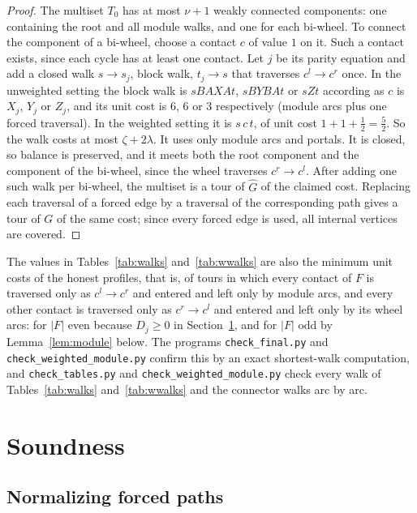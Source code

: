 \documentclass[11pt]{amsart}
\theoremstyle{definition}
\theoremstyle{remark}
\numberwithin{equation}{section}
\newcommand{\Gh}{\widehat{G}}
\begin{document}
\begin{proof}
The multiset $T_0$ has at most $\nu+1$ weakly connected components: one containing the root and all module walks, and one for each bi-wheel. To connect the component of a bi-wheel, choose a contact $c$ of value $1$ on it. Such a contact exists, since each cycle has at least one contact. Let $j$ be its parity equation and add a closed walk $s\to s_j$, block walk, $t_j\to s$ that traverses $c^l\to c^r$ once. In the unweighted setting the block walk is $sBAXAt$, $sBYBAt$ or $sZt$ according as $c$ is $X_j$, $Y_j$ or $Z_j$, and its unit cost is $6$, $6$ or $3$ respectively (module arcs plus one forced traversal). In the weighted setting it is $s\,c\,t$, of unit cost $1+1+\frac12=\frac52$. So the walk costs at most $\zeta+2\lambda$. It uses only module arcs and portals. It is closed, so balance is preserved, and it meets both the root component and the component of the bi-wheel, since the wheel traverses $c^r\to c^l$. After adding one such walk per bi-wheel, the multiset is a tour of $\Gh$ of the claimed cost. Replacing each traversal of a forced edge by a traversal of the corresponding path gives a tour of $G$ of the same cost; since every forced edge is used, all internal vertices are covered.
\end{proof}

The values in Tables~\ref{tab:walks} and~\ref{tab:wwalks} are also the minimum unit costs of the honest profiles, that is, of tours in which every contact of $F$ is traversed only as $c^l\to c^r$ and entered and left only by module arcs, and every other contact is traversed only as $c^r\to c^l$ and entered and left only by its wheel arcs: for $|F|$ even because $D_j\ge0$ in Section~\ref{sec:soundness}, and for $|F|$ odd by Lemma~\ref{lem:module} below. The programs \texttt{check\_final.py} and \texttt{check\_weighted\_module.py} confirm this by an exact shortest-walk computation, and \texttt{check\_tables.py} and \texttt{check\_weighted\_module.py} check every walk of Tables~\ref{tab:walks} and~\ref{tab:wwalks} and the connector walks arc by arc.

\section{Soundness}\label{sec:soundness}

\subsection{Normalizing forced paths}
\end{document}
